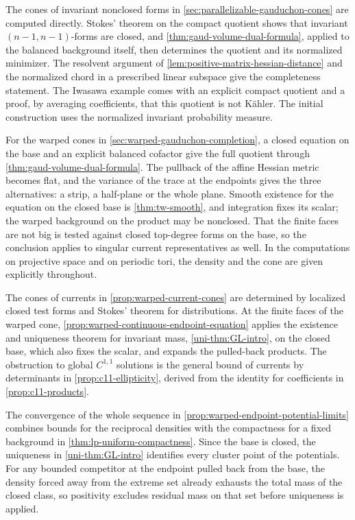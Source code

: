 The cones of invariant nonclosed forms in \cref{sec:parallelizable-gauduchon-cones} are computed directly. Stokes' theorem on the compact quotient shows that invariant $(n-1,n-1)$-forms are closed, and \cref{thm:gaud-volume-dual-formula}, applied to the balanced background itself, then determines the quotient and its normalized minimizer. The resolvent argument of \cref{lem:positive-matrix-hessian-distance} and the normalized chord in a prescribed linear subspace give the completeness statement. The Iwasawa example comes with an explicit compact quotient and a proof, by averaging coefficients, that this quotient is not K\"ahler. The initial construction uses the normalized invariant probability measure.

For the warped cones in \cref{sec:warped-gauduchon-completion}, a closed equation on the base and an explicit balanced cofactor give the full quotient through \cref{thm:gaud-volume-dual-formula}. The pullback of the affine Hessian metric becomes flat, and the variance of the trace at the endpoints gives the three alternatives: a strip, a half-plane or the whole plane. Smooth existence for the equation on the closed base is \cref{thm:tw-smooth}, and integration fixes its scalar; the warped background on the product may be nonclosed. That the finite faces are not big is tested against closed top-degree forms on the base, so the conclusion applies to singular current representatives as well. In the computations on projective space and on periodic tori, the density and the cone are given explicitly throughout.

The cones of currents in \cref{prop:warped-current-cones} are determined by localized closed test forms and Stokes' theorem for distributions. At the finite faces of the warped cone, \cref{prop:warped-continuous-endpoint-equation} applies the existence and uniqueness theorem for invariant mass, \cref{uni-thm:GL-intro}, on the closed base, which also fixes the scalar, and expands the pulled-back products. The obstruction to global $C^{1,1}$ solutions is the general bound of currents by determinants in \cref{prop:c11-ellipticity}, derived from the identity for coefficients in \cref{prop:c11-products}.

The convergence of the whole sequence in \cref{prop:warped-endpoint-potential-limits} combines bounds for the reciprocal densities with the compactness for a fixed background in \cref{thm:lp-uniform-compactness}. Since the base is closed, the uniqueness in \cref{uni-thm:GL-intro} identifies every cluster point of the potentials. For any bounded competitor at the endpoint pulled back from the base, the density forced away from the extreme set already exhausts the total mass of the closed class, so positivity excludes residual mass on that set before uniqueness is applied.

